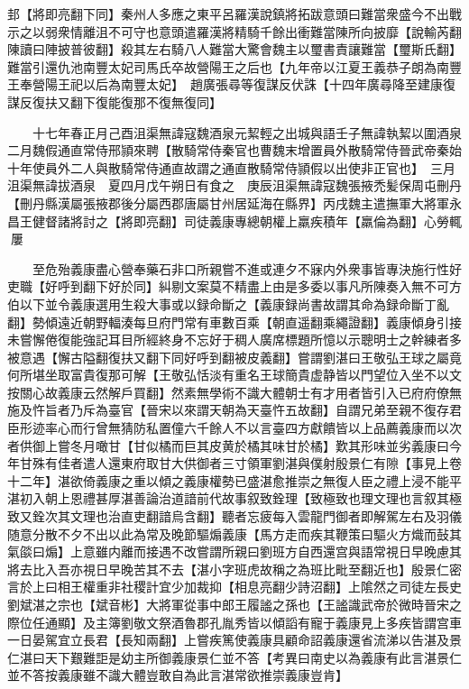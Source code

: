 邽【將即亮翻下同】秦州人多應之東平呂羅漢說鎮將拓跋意頭曰難當衆盛今不出戰示之以弱衆情離沮不可守也意頭遣羅漢將精騎千餘出衝難當陳所向披靡【說輸芮翻陳讀曰陣披普彼翻】殺其左右騎八人難當大驚會魏主以璽書責讓難當【璽斯氏翻】難當引還仇池南豐太妃司馬氏卒故營陽王之后也【九年帝以江夏王義恭子朗為南豐王奉營陽王祀以后為南豐太妃】　趙廣張尋等復謀反伏誅【十四年廣尋降至建康復謀反復扶又翻下復能復那不復無復同】

　　十七年春正月己酉沮渠無諱寇魏酒泉元絜輕之出城與語壬子無諱執絜以圍酒泉　二月魏假通直常侍邢頴來聘【散騎常侍秦官也曹魏末增置員外散騎常侍晉武帝秦始十年使員外二人與散騎常侍通直故謂之通直散騎常侍頴假以出使非正官也】　三月沮渠無諱拔酒泉　夏四月戊午朔日有食之　庚辰沮渠無諱寇魏張掖禿髪保周屯刪丹【刪丹縣漢屬張掖郡後分屬西郡唐屬甘州居延海在縣界】丙戌魏主遣撫軍大將軍永昌王健督諸將討之【將即亮翻】司徒義康專總朝權上羸疾積年【羸倫為翻】心勞輒屢

　　至危殆義康盡心營奉藥石非口所親嘗不進或連夕不寐内外衆事皆專決施行性好吏職【好呼到翻下好於同】糾剔文案莫不精盡上由是多委以事凡所陳奏入無不可方伯以下並令義康選用生殺大事或以録命斷之【義康録尚書故謂其命為録命斷丁亂翻】勢傾遠近朝野輻湊每旦府門常有車數百乘【朝直遥翻乘繩證翻】義康傾身引接未嘗懈倦復能強記耳目所經終身不忘好于稠人廣席標題所憶以示聰明士之幹練者多被意遇【懈古隘翻復扶又翻下同好呼到翻被皮義翻】嘗謂劉湛曰王敬弘王球之屬竟何所堪坐取富貴復那可解【王敬弘恬淡有重名王球簡貴虚静皆以門望位入坐不以文按關心故義康云然解戶買翻】然素無學術不識大體朝士有才用者皆引入已府府僚無施及忤旨者乃斥為臺官【晉宋以來謂天朝為天臺忤五故翻】自謂兄弟至親不復存君臣形迹率心而行曾無猜防私置僮六千餘人不以言臺四方獻饋皆以上品薦義康而以次者供御上嘗冬月噉甘【甘似橘而巨其皮黄於橘其味甘於橘】歎其形味並劣義康曰今年甘殊有佳者遣人還東府取甘大供御者三寸領軍劉湛與僕射殷景仁有隙【事見上卷十二年】湛欲倚義康之重以傾之義康權勢已盛湛愈推崇之無復人臣之禮上浸不能平湛初入朝上恩禮甚厚湛善論治道諳前代故事叙致銓理【致極致也理文理也言叙其極致又銓次其文理也治直吏翻諳烏含翻】聽者忘疲每入雲龍門御者即解駕左右及羽儀随意分散不夕不出以此為常及晚節驅煽義康【馬方走而疾其鞭策曰驅火方熾而鼔其氣燄曰煽】上意雖内離而接遇不改嘗謂所親曰劉班方自西還宫與語常視日早晚慮其將去比入吾亦視日早晚苦其不去【湛小字班虎故稱之為班比毗至翻近也】殷景仁密言於上曰相王權重非社稷計宜少加裁抑【相息亮翻少詩沼翻】上隂然之司徒左長史劉斌湛之宗也【斌音彬】大將軍從事中郎王履謐之孫也【王謐識武帝於微時晉宋之際位任通顯】及主簿劉敬文祭酒魯郡孔胤秀皆以傾謟有寵于義康見上多疾皆謂宫車一日晏駕宜立長君【長知兩翻】上嘗疾篤使義康具顧命詔義康還省流涕以告湛及景仁湛曰天下艱難詎是幼主所御義康景仁並不答【考異曰南史以為義康有此言湛景仁並不答按義康雖不識大體豈敢自為此言湛常欲推崇義康豈肯】

